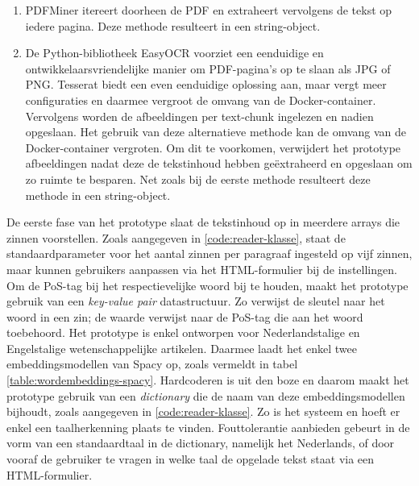 \begin{enumerate}
	\item PDFMiner itereert doorheen de PDF en extraheert vervolgens de tekst op iedere pagina. Deze methode resulteert in een string-object.
	\item De Python-bibliotheek EasyOCR voorziet een eenduidige en ontwikkelaarsvriendelijke manier om PDF-pagina's op te slaan als JPG of PNG. Tesserat biedt een even eenduidige oplossing aan, maar vergt meer configuraties en daarmee vergroot de omvang van de Docker-container. Vervolgens worden de afbeeldingen per text-chunk ingelezen en nadien opgeslaan. Het gebruik van deze alternatieve methode kan de omvang van de Docker-container vergroten. Om dit te voorkomen, verwijdert het prototype afbeeldingen nadat deze de tekstinhoud hebben geëxtraheerd en opgeslaan om zo ruimte te besparen. Net zoals bij de eerste methode resulteert deze methode in een string-object.
\end{enumerate}

De eerste fase van het prototype slaat de tekstinhoud op in meerdere arrays die zinnen voorstellen. Zoals aangegeven in \ref{code:reader-klasse}, staat de standaardparameter voor het aantal zinnen per paragraaf ingesteld op vijf zinnen, maar kunnen gebruikers aanpassen via het HTML-formulier bij de instellingen. Om de PoS-tag bij het respectievelijke woord bij te houden, maakt het prototype gebruik van een \textit{key-value pair} datastructuur. Zo verwijst de sleutel naar het woord in een zin; de waarde verwijst naar de PoS-tag die aan het woord toebehoord. Het prototype is enkel ontworpen voor Nederlandstalige en Engelstalige wetenschappelijke artikelen. Daarmee laadt het enkel twee embeddingsmodellen van Spacy op, zoals vermeldt in tabel \ref{table:wordembeddings-spacy}. Hardcoderen is uit den boze en daarom maakt het prototype gebruik van een \textit{dictionary} die de naam van deze embeddingsmodellen bijhoudt, zoals aangegeven in \ref{code:reader-klasse}. Zo is het systeem en hoeft er enkel een taalherkenning plaats te vinden. Fouttolerantie aanbieden gebeurt in de vorm van een standaardtaal in de dictionary, namelijk het Nederlands, of door vooraf de gebruiker te vragen in welke taal de opgelade tekst staat via een HTML-formulier.


